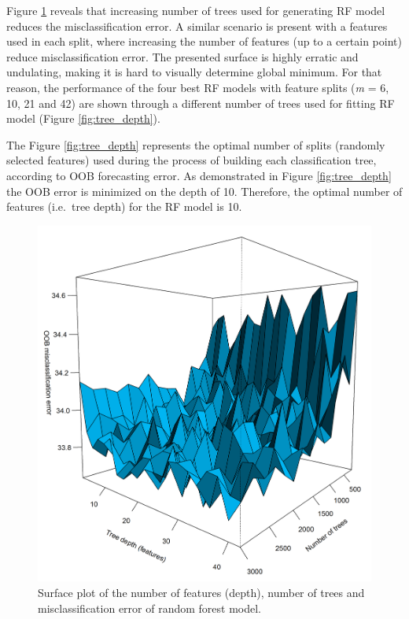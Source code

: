 \documentclass[preprint, 3p,
authoryear]{elsarticle} %
\begin{document}
Figure \ref{fig:surface} reveals that increasing number of trees used
for generating RF model reduces the misclassification error. A similar
scenario is present with a features used in each split, where increasing
the number of features (up to a certain point) reduce misclassification
error. The presented surface is highly erratic and undulating, making it
is hard to visually determine global minimum. For that reason, the
performance of the four best RF models with feature splits (\emph{m} =
6, 10, 21 and 42) are shown through a different number of trees used for
fitting RF model (Figure \ref{fig:tree_depth}).

The Figure \ref{fig:tree_depth} represents the optimal number of splits
(randomly selected features) used during the process of building each
classification tree, according to OOB forecasting error. As demonstrated
in Figure \ref{fig:tree_depth} the OOB error is minimized on the depth
of 10. Therefore, the optimal number of features (i.e.~tree depth) for
the RF model is 10.

\begin{figure}[H]

{\centering \includegraphics[width=0.7\linewidth]{img/300dpi/Fig_persp} 

}

\caption{Surface plot of the number of features (depth), number of trees and misclassification error of random forest model.}\label{fig:surface}
\end{figure}
\end{document}
